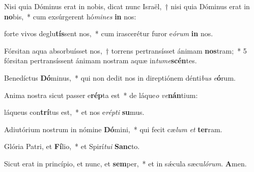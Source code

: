 \item Nisi quia Dóminus erat in nobis, dicat nunc Israël,~† nisi quia Dóminus erat in \textbf{no}bis,~* cum exsúrgerent hó\textit{mi}\textit{nes} \textbf{in} nos:

\item forte vivos deglu\textbf{tís}sent nos,~* cum irascerétur furor e\textit{ó}\textit{rum} \textbf{in} nos.

\item Fórsitan aqua absorbuísset nos,~† torrens pertransísset ánimam \textbf{nos}tram;~* 5 fórsitan pertransíssent ánimam nostram aquæ in\textit{tu}\textit{me}\textbf{scén}tes.

\item Benedíctus \textbf{Dó}minus,~* qui non dedit nos in direptiónem dénti\textit{bus} \textit{e}\textbf{ó}rum.

\item Anima nostra sicut passer e\textbf{rép}ta est~* de láque\textit{o} \textit{ve}\textbf{nán}tium:

\item láqueus con\textbf{trí}tus est,~* et nos e\textit{rép}\textit{ti} \textbf{su}mus.

\item Adiutórium nostrum in nómine \textbf{Dó}mini,~* qui fecit cæ\textit{lum} \textit{et} \textbf{ter}ram.

\item Glória Patri, et \textbf{Fí}lio,~* et Spirí\textit{tu}\textit{i} \textbf{Sanc}to.

\item Sicut erat in princípio, et nunc, et \textbf{sem}per,~* et in sǽcula sæcu\textit{ló}\textit{rum}. \textbf{A}men.